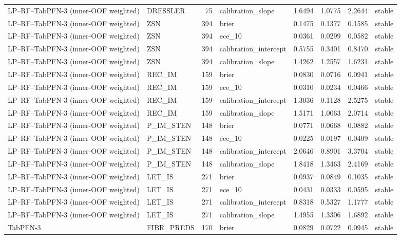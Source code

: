 \begin{longtable}{llrlrrrl}
LP--RF--TabPFN-3 (inner-OOF weighted) & DRESSLER & 75 & calibration\_slope & 1.6494 & 1.0775 & 2.2644 & stable \\
LP--RF--TabPFN-3 (inner-OOF weighted) & ZSN & 394 & brier & 0.1475 & 0.1377 & 0.1585 & stable \\
LP--RF--TabPFN-3 (inner-OOF weighted) & ZSN & 394 & ece\_10 & 0.0361 & 0.0299 & 0.0582 & stable \\
LP--RF--TabPFN-3 (inner-OOF weighted) & ZSN & 394 & calibration\_intercept & 0.5755 & 0.3401 & 0.8470 & stable \\
LP--RF--TabPFN-3 (inner-OOF weighted) & ZSN & 394 & calibration\_slope & 1.4262 & 1.2557 & 1.6231 & stable \\
LP--RF--TabPFN-3 (inner-OOF weighted) & REC\_IM & 159 & brier & 0.0830 & 0.0716 & 0.0941 & stable \\
LP--RF--TabPFN-3 (inner-OOF weighted) & REC\_IM & 159 & ece\_10 & 0.0310 & 0.0234 & 0.0466 & stable \\
LP--RF--TabPFN-3 (inner-OOF weighted) & REC\_IM & 159 & calibration\_intercept & 1.3036 & 0.1128 & 2.5275 & stable \\
LP--RF--TabPFN-3 (inner-OOF weighted) & REC\_IM & 159 & calibration\_slope & 1.5171 & 1.0063 & 2.0714 & stable \\
LP--RF--TabPFN-3 (inner-OOF weighted) & P\_IM\_STEN & 148 & brier & 0.0771 & 0.0668 & 0.0882 & stable \\
LP--RF--TabPFN-3 (inner-OOF weighted) & P\_IM\_STEN & 148 & ece\_10 & 0.0225 & 0.0197 & 0.0409 & stable \\
LP--RF--TabPFN-3 (inner-OOF weighted) & P\_IM\_STEN & 148 & calibration\_intercept & 2.0646 & 0.8901 & 3.3704 & stable \\
LP--RF--TabPFN-3 (inner-OOF weighted) & P\_IM\_STEN & 148 & calibration\_slope & 1.8418 & 1.3463 & 2.4169 & stable \\
LP--RF--TabPFN-3 (inner-OOF weighted) & LET\_IS & 271 & brier & 0.0937 & 0.0849 & 0.1035 & stable \\
LP--RF--TabPFN-3 (inner-OOF weighted) & LET\_IS & 271 & ece\_10 & 0.0431 & 0.0333 & 0.0595 & stable \\
LP--RF--TabPFN-3 (inner-OOF weighted) & LET\_IS & 271 & calibration\_intercept & 0.8318 & 0.5327 & 1.1777 & stable \\
LP--RF--TabPFN-3 (inner-OOF weighted) & LET\_IS & 271 & calibration\_slope & 1.4955 & 1.3306 & 1.6892 & stable \\
TabPFN-3 & FIBR\_PREDS & 170 & brier & 0.0829 & 0.0722 & 0.0945 & stable \\

\end{longtable}
